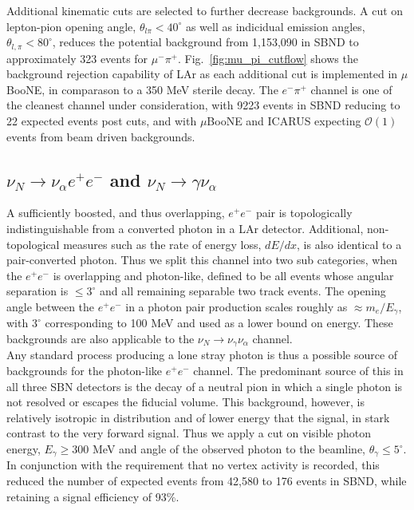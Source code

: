 \documentclass[11pt, a4paper]{article}
\newcommand{\reffig}[1]{Fig.~\ref{#1}}
\begin{document}
Additional kinematic cuts are selected to further decrease backgrounds. A cut on lepton-pion opening angle, $\theta_{l \pi} < 40^\circ$ as well as indicidual emission angles, $\theta_{l,\pi} < 80^\circ$, reduces the potential background from 1,153,090 in SBND to approximately 323 events for $\mu^- \pi^+$.  \reffig{fig:mu_pi_cutflow} shows the background rejection capability of LAr as each additional cut is implemented in $\mu$BooNE, in comparason to a 350 MeV sterile decay. The $e^- \pi^+$ channel is one of the cleanest channel under consideration, with 9223 events in SBND reducing to 22 expected events post cuts, and with $\mu$BooNE and ICARUS expecting $\mathcal{O}(1)$ events from beam driven backgrounds.


\subsection{$\nu_N \rightarrow \nu_\alpha e^+ e^-$ and $\nu_N \rightarrow \gamma \nu_\alpha$ }
A sufficiently boosted, and thus overlapping, $e^+e^-$ pair is topologically indistinguishable from a converted photon in a LAr detector. Additional, non-topological measures such as the rate of energy loss, $dE/dx$, is also identical to a pair-converted photon. Thus we split this channel into two sub categories, when the $e^+e^-$ is overlapping and photon-like, defined to be all events whose angular separation is $\leq 3^\circ$\cite{Spitz:2011wba} and all remaining separable two track events. The opening angle between the $e^+e^-$ in a photon pair production scales roughly as $\approx m_e/E_\gamma$, with $3^\circ$ corresponding to 100 MeV and used as a lower bound on energy. These backgrounds are also applicable to the $\nu_N \rightarrow \nu_\gamma \nu_\alpha$ channel.\\ 

Any standard process producing a lone stray photon is thus a possible source of backgrounds for the photon-like $e^+e^-$ channel. The predominant source of this in all three SBN detectors is the decay of a neutral pion in which a single photon is not resolved or escapes the fiducial volume. This background, however, is relatively isotropic in distribution and of lower energy that the signal, in stark contrast to the very forward signal. Thus we apply a cut on visible photon energy, $E_\gamma \geq 300 $ MeV and angle of the observed photon to the beamline, $\theta_\gamma \leq 5^\circ$. In conjunction with the requirement that no vertex activity is recorded, this reduced the number of expected events from 42,580 to 176 events in SBND, while retaining a signal efficiency of 93\%.
\end{document}

